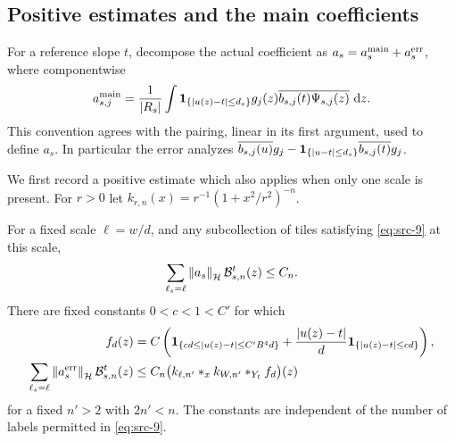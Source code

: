 \subsection{Positive estimates and the main coefficients}

For a reference slope $t$, decompose the actual coefficient as
$a_s=a_s^{\rm main}+a_s^{\rm err}$, where componentwise
\begin{equation}\label{conc:main-coefficient}
 a_{s,j}^{\rm main}
 =\frac1{\left|R_s\right|}\int
 \mathbf 1_{\{\left|u(z)-t\right|\leq d_s\}}
 g_j(z)\overline{b_{s,j}(t)\Psi_{s,j}(z)}\,\,\mathrm d z.
\end{equation}
This convention agrees with the pairing, linear in its first argument,
used to define $a_s$.  In particular the error analyzes
$\overline{b_{s,j}(u)}g_j-
\mathbf 1_{\{\left|u-t\right|\leq d_s\}}\overline{b_{s,j}(t)}g_j$.

We first record a positive estimate which also applies when only one
scale is present.  For $r>0$ let
$k_{r,n}(x)=r^{-1}(1+x^2/r^2)^{-n}$.

\begin{lemma}\label{conc:single-scale}
For a fixed scale $\ell=w/d$, and any subcollection of tiles satisfying
\eqref{eq:src-9} at this scale,
\begin{equation}\label{conc:original-positive}
 \sum_{\ell_s=\ell}\left\|a_s\right\|_{\mathcal H}
       \mathcal B_{s,n}^{t}(z)\leq C_n.
\end{equation}
There are fixed constants $0<c<1<C'$ for which
\begin{align}
 f_d(z)&=C\left(
 \mathbf 1_{\{cd\leq\left|u(z)-t\right|\leq C'B^4d\}}
 +\frac{\left|u(z)-t\right|}{d}
       \mathbf 1_{\{\left|u(z)-t\right|\leq cd\}}\right),
       \label{conc:error-input}\\
 \sum_{\ell_s=\ell}\left\|a_s^{\rm err}\right\|_{\mathcal H}
       \mathcal B_{s,n}^{t}(z)
 &\leq C_n
 \big(k_{\ell,n'}*_{x} k_{W,n'}*_{Y_t}f_d\big)(z)
       \label{conc:error-majorant}
\end{align}
for a fixed $n'>2$ with $2n'<n$.  The constants are independent of
the number of labels permitted in \eqref{eq:src-9}.
\end{lemma}

